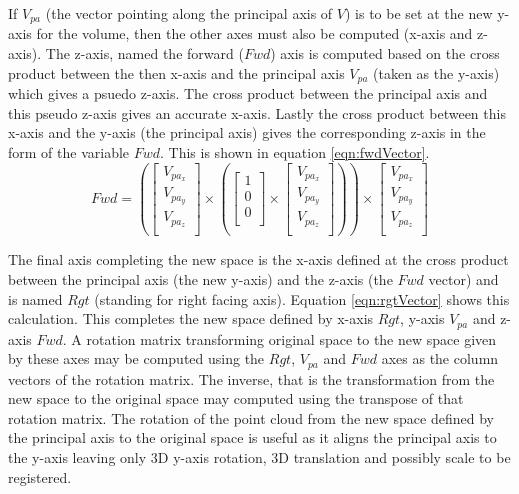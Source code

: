 If $V_{pa}$ (the vector pointing along the principal axis of $V$) is to be set at the new y-axis for the volume, then the other axes must also be computed (x-axis and z-axis). The z-axis, named the forward ($Fwd$) axis is computed based on the cross product between the then x-axis and the principal axis $V_{pa}$ (taken as the y-axis) which gives a psuedo z-axis. The cross product between the principal axis and this pseudo z-axis gives an accurate x-axis. Lastly the cross product between this x-axis and the y-axis (the principal axis) gives the corresponding z-axis in the form of the variable $Fwd$. This is shown in equation \ref{eqn:fwdVector}. \\


\begin{equation} \label{eqn:fwdVector}
Fwd = \left(\left[
\begin{array}{c}
V_{pa_{x}}\\
V_{pa_{y}}\\
V_{pa_{z}}\\
\end{array}
\right] \times \left(\left[
\begin{array}{c}
1\\
0\\
0\\
\end{array}
\right] \times \left[
\begin{array}{c}
V_{pa_{x}}\\
V_{pa_{y}}\\
V_{pa_{z}}\\
\end{array}
\right]\right)\right) \times \left[
\begin{array}{c}
V_{pa_{x}}\\
V_{pa_{y}}\\
V_{pa_{z}}\\
\end{array}
\right]
\end{equation}

The final axis completing the new space is the x-axis defined at the cross product between the principal axis (the new y-axis) and the z-axis (the $Fwd$ vector) and is named $Rgt$ (standing for right facing axis). Equation \ref{eqn:rgtVector} shows this calculation. This completes the new space defined by x-axis $Rgt$, y-axis $V_{pa}$ and z-axis $Fwd$. A rotation matrix transforming original space to the new space given by these axes may be computed using the $Rgt$, $V_{pa}$ and $Fwd$ axes as the column vectors of the rotation matrix. The inverse, that is the transformation from the new space to the original space may computed using the transpose of that rotation matrix. The rotation of the point cloud from the new space defined by the principal axis to the original space is useful as it aligns the principal axis to the y-axis leaving only 3D y-axis rotation, 3D translation and possibly scale to be registered. \\ 



